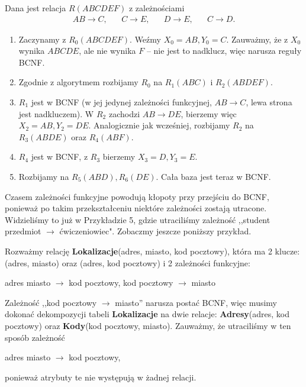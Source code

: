\begin{example}
    Dana jest relacja $R(ABCDEF)$ z zależnościami
    \begin{align*}
        AB \to C, \hspace{20pt} C \to E, \hspace{20pt} D \to E, \hspace{20pt} C \to D.
    \end{align*}

    \begin{enumerate}
        \item Zaczynamy z $R_0(ABCDEF)$. Weźmy $X_0=AB, Y_0=C$. Zauważmy, że z $X_0$ wynika $ABCDE$, ale nie wynika $F$ -- nie jest to nadklucz, więc narusza reguły BCNF.
        \item Zgodnie z algorytmem rozbijamy $R_0$ na $R_1(ABC)$ i $R_2(ABDEF)$. 
        \item $R_1$ jest w BCNF (w jej jedynej zależności funkcyjnej, $AB \to C$, lewa strona jest nadkluczem). W $R_2$ zachodzi $AB \to DE$, bierzemy więc $X_2=AB, Y_2=DE$. Analogicznie jak wcześniej, rozbijamy $R_2$ na $R_3(ABDE)$ oraz $R_4(ABF)$. 
        \item $R_4$ jest w BCNF, z $R_3$ bierzemy $X_3 = D, Y_3 = E$. 
        \item Rozbijamy na $R_5(ABD), R_6(DE)$. Cała baza jest teraz w BCNF.
    \end{enumerate}
\end{example}

Czasem zależności funkcyjne powodują kłopoty przy przejściu do BCNF, ponieważ po takim przekształceniu niektóre zależności zostają utracone. Widzieliśmy to już w Przykładzie 5, gdzie utraciliśmy zależność ,,student przedmiot $\to$ ćwiczeniowiec". Zobaczmy jeszcze poniższy przykład.

\begin{example}
Rozważmy relację \textbf{Lokalizacje}(adres, miasto, kod pocztowy), która ma 2 klucze: (adres, miasto) oraz (adres, kod pocztowy) i 2 zależności funkcyjne:
\begin{center}
    adres miasto $\to$ kod pocztowy,
    \qquad kod pocztowy $\to$ miasto
\end{center}

Zależność ,,kod pocztowy $\to$ miasto'' narusza postać BCNF, więc musimy dokonać dekompozycji tabeli \textbf{Lokalizacje} na dwie relacje: \textbf{Adresy}(adres, kod pocztowy) oraz \textbf{Kody}(kod pocztowy, miasto). Zauważmy, że utraciliśmy w ten sposób zależność
\begin{center}
    adres miasto $\to$ kod pocztowy,
\end{center}
ponieważ atrybuty te nie występują w żadnej relacji.
\end{example}



